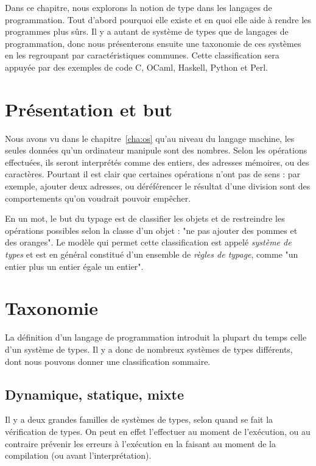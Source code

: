 Dans ce chapitre, nous explorons la notion de type dans les langages de
programmation. Tout d'abord pourquoi elle existe et en quoi elle aide à rendre
les programmes plus sûrs. Il y a autant de système de types que de langages de
programmation, donc nous présenterons ensuite une taxonomie de ces systèmes en
les regroupant par caractéristiques communes. Cette classification sera appuyée
par des exemples de code C\cite{AnsiC,KandR}, OCaml\cite{ocamlManual,DAOC},
Haskell\cite{haskell98,rwh}, Python\cite{pythonSite} et
Perl\cite{perlCamelBook}.

\section{Présentation et but}

Nous avons vu dans le chapitre~\ref{cha:os} qu'au niveau du langage machine, les
seules données qu'un ordinateur manipule sont des nombres. Selon les opérations
effectuées, ils seront interprétés comme des entiers, des adresses mémoires, ou
des caractères. Pourtant il est clair que certaines opérations n'ont pas de sens
: par exemple, ajouter deux adresses, ou déréférencer le résultat d'une division
sont des comportements qu'on voudrait pouvoir empêcher.

En un mot, le but du typage est de classifier les objets et de restreindre les
opérations possibles selon la classe d'un objet : "ne pas ajouter des pommes et
des oranges". Le modèle qui permet cette classification est appelé \emph{système
de types} et est en général constitué d'un ensemble de \emph{règles de typage},
comme "un entier plus un entier égale un entier".

\section{Taxonomie}

La définition d'un langage de programmation introduit la plupart du temps celle
d'un système de types. Il y a donc de nombreux systèmes de types différents,
dont nous pouvons donner une classification sommaire.

\subsection{Dynamique, statique, mixte}

Il y a deux grandes familles de systèmes de types, selon quand se fait la
vérification de types. On peut en effet l'effectuer au moment de l'exécution, ou
au contraire prévenir les erreurs à l'exécution en la faisant au moment de la
compilation (ou avant l'interprétation).

